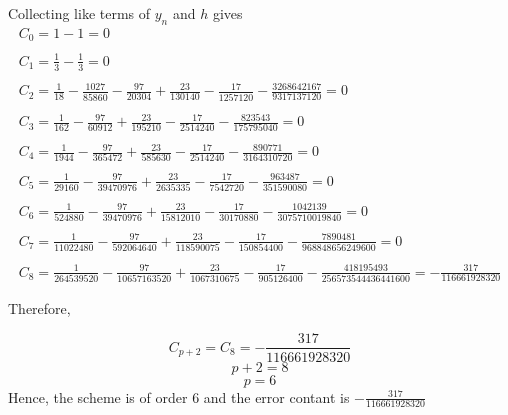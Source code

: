 \documentclass[12pt]{report}
\begin{document}
\noindent Collecting like terms of $y_n$ and $h$ gives\\
\[
\begin{array}{l}
C_{0} = 1 - 1 = 0 \\\\
C_{1} = \frac{1}{3} - \frac{1}{3} = 0 \\\\
C_{2} = {\frac{1}{18}} - {\frac{1027}{85860}}-{\frac{97}{20304}}+{\frac{23}{130140}}-{\frac{17}{1257120}}-{\frac{3268642167}{9317137120}} = 0 \\\\
C_{3} = {\frac{1}{162}} - {\frac{97}{60912}}+{\frac{23}{195210}}-{\frac{17}{2514240}}-{\frac{823543}{175795040}} = 0\\\\
C_{4} = {\frac{1}{1944}} - {\frac{97}{365472}}+{\frac{23}{585630}}-{\frac{17}{2514240}}-{\frac {890771}{3164310720}} = 0 \\\\
C_{5} = {\frac{1}{29160}} - {\frac {97}{39470976}}+{\frac {23}{2635335}}-{\frac {17}{7542720}}-{\frac {963487}{351590080}} = 0\\\\
C_{6} = {\frac{1}{524880}}-{\frac {97}{39470976}}+{\frac {23}{15812010}}-{\frac {17}{30170880}}-{\frac {1042139}{3075710019840}}=0\\\\
C_{7} = {\frac{1}{11022480}}-{\frac {97}{592064640}}+{\frac {23}{118590075}}-{\frac {17}{150854400}}-{\frac {7890481}{968848656249600}} =0  \\\\
C_{8} = {\frac{1}{264539520}}-{\frac {97}{10657163520}}+{\frac {23}{1067310675}}-{\frac {17}{905126400}}-{\frac {418195493}{256573544436441600}} =  -{\frac{317}{116661928320}}
\end{array}
\]

\noindent Therefore, 

$$C_{p+2}=C_8=-{\frac{317}{116661928320}}$$
$$p + 2 =8$$
$$p = 6 $$
\noindent Hence, the scheme is of order 6 and the error contant is $-{\frac{317}{116661928320}}$
\end{document}
